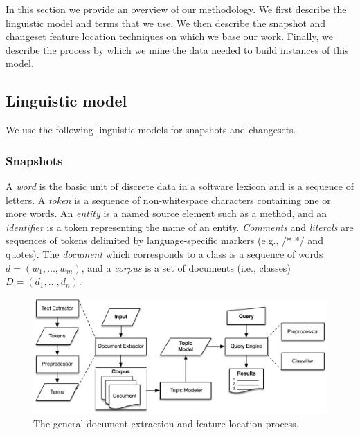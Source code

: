 
In this section we provide an overview of our methodology.
We first describe the linguistic model and terms that we use.
We then describe the snapshot and changeset feature location techniques on which we base our work.
Finally, we describe the process by which we mine the data needed to build instances of this model.

\subsection{Linguistic model}
\label{sec:extract}

We use the following linguistic models for snapshots and changesets.

\subsubsection{Snapshots}

A \textit{word} is the basic unit of discrete data in a software lexicon and is a sequence of letters.
A \textit{token} is a sequence of non-whitespace characters containing one or more words.
An \textit{entity} is a named source element such as a method,
and an \textit{identifier} is a token representing the name of an entity.
\textit{Comments} and \textit{literals} are sequences of tokens delimited by language-specific markers (e.g., /* */ and quotes).
The \textit{document} which corresponds to a class is a sequence of words $d = (w_1, \ldots, w_m)$,
and a \textit{corpus} is a set of documents (i.e., classes) $D = (d_1, \ldots, d_n)$.

\begin{figure}
\vspace{2mm}
\centerline{\includegraphics[width=.8625\textwidth]{figures/Process}}
\caption{The general document extraction and feature location process.}
\label{fig:extract}
\vspace{-2mm}
\end{figure}

